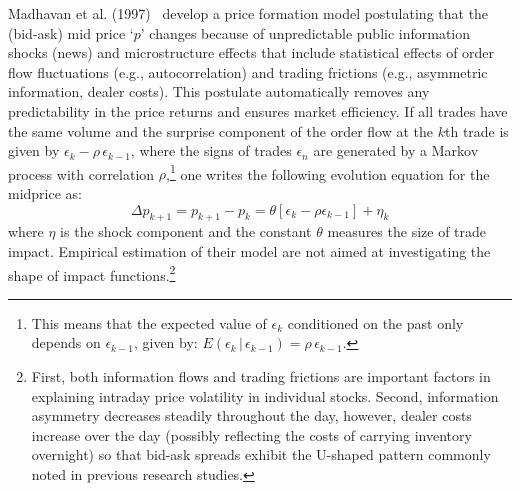 Madhavan et al. (1997)~\cite{madhaven1997} develop a price formation model postulating that the (bid-ask) mid price `$p$' changes because of unpredictable public information shocks (news) and microstructure effects that include statistical effects of order flow fluctuations (e.g., autocorrelation) and trading frictions (e.g., asymmetric information, dealer costs). This postulate automatically removes any predictability in the price returns and ensures market efficiency. If all trades have the same volume and the surprise component of the order flow at the $k$th trade is given by $\epsilon_k - \rho \,\epsilon_{k-1}$, where the signs of trades $\epsilon_n$ are generated by a Markov process with correlation $\rho$,\footnote{This means that the expected value of $\epsilon_k$ conditioned on the past only depends on $\epsilon_{k-1}$, given by: $E(\epsilon_k\,|\,\epsilon_{k-1})=\rho\,\epsilon_{k-1}$.}  one writes the following evolution equation for the midprice as:
	\begin{equation}\label{eqn:midpointdelta}
	\Delta p_{k+1}=p_{k+1}-p_k=\theta[\epsilon_k - \rho \epsilon_{k-1}]+\eta_k
	\end{equation}
where $\eta$ is the shock component and the constant $\theta$ measures the size of trade impact. Empirical estimation of their model are not aimed at investigating the shape of impact functions.\footnote{First, both information flows and trading frictions are important factors in explaining intraday price volatility in individual stocks. Second, information asymmetry decreases steadily throughout the day, however, dealer costs increase over the day (possibly reflecting the costs of carrying inventory overnight) so that bid-ask spreads exhibit the U-shaped pattern commonly noted in previous research studies.}



